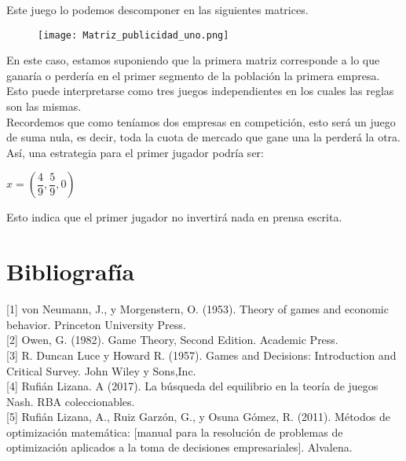\documentclass[10pt,a4paper]{book}
\begin{document}
Este juego lo podemos descomponer en las siguientes matrices.\\

\begin{figure}[htb]
\centering
\texttt{[image: Matriz\_publicidad\_uno.png]}
\end{figure} 


En este caso, estamos suponiendo que la primera matriz corresponde a lo que ganaría o perdería en el primer segmento de la población la primera empresa.\\

Esto puede interpretarse como tres juegos independientes en los cuales las reglas son las mismas.\\

Recordemos que como teníamos dos empresas en competición, esto será un juego de suma nula, es decir, toda la cuota de mercado que gane una la perderá la otra.\\

Así, una estrategia para el primer jugador podría ser:\\

\begin{center}

$x=(\dfrac{4}{9},\dfrac{5}{9},0)$

\end{center}

Esto indica que el primer jugador no invertirá nada en prensa escrita.\\

\chapter{Bibliografía}

[1] von Neumann, J., y  Morgenstern, O. (1953). Theory of games and economic behavior. Princeton University Press.\\


[2] Owen, G. (1982). Game Theory, Second Edition. Academic Press.\\

[3] R. Duncan Luce y Howard R. (1957). Games and Decisions: Introduction and Critical Survey. John Wiley y Sons,Inc.\\

[4] Rufián Lizana. A (2017). La búsqueda del equilibrio en la teoría de juegos Nash. RBA coleccionables.\\

[5] Rufián Lizana, A., Ruiz Garzón, G., y Osuna Gómez, R. (2011). Métodos de optimización matemática: [manual para la resolución de problemas de optimización aplicados a la toma de decisiones empresariales]. Alvalena.\\
\end{document}
